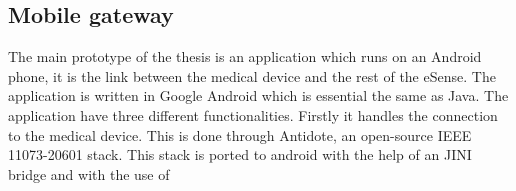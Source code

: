 
\subsection{Mobile gateway}
\label{sub:mobilegateway}
The main prototype of the thesis is an application which runs on an Android phone, it is the link between the medical device and the rest of the eSense. The application is written in Google Android which is essential the same as Java. The application have three different functionalities. Firstly it handles the connection to the medical device. This is done through Antidote, an open-source IEEE 11073-20601 stack. This stack is ported to android with the help of an JINI bridge and with the use of 
